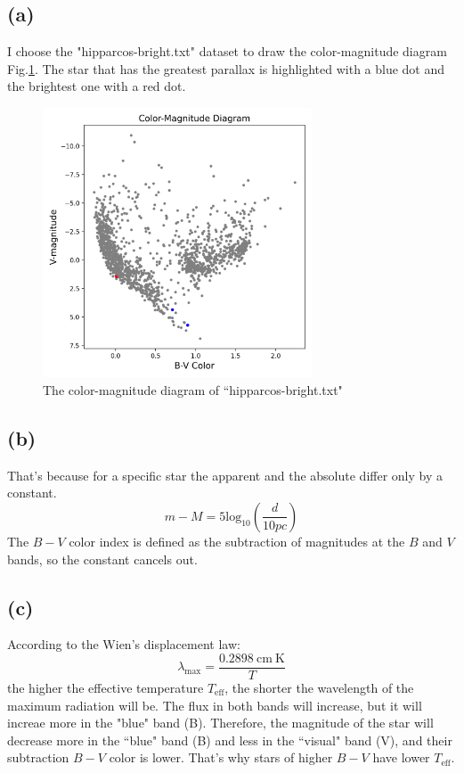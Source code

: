 \documentclass[a4paper,12pt]{article}
\begin{document}
\subsection*{(a)}
I choose the "hipparcos-bright.txt" dataset to draw the 
color-magnitude diagram Fig.\ref{fig1}. The star that has the greatest parallax is 
highlighted with a blue dot and the brightest one with a red dot.
\begin{figure}[htbp]
    \centering
    \includegraphics[width=8cm]{color_mag.png}
    \caption{The color-magnitude diagram of ``hipparcos-bright.txt"}
    \label{fig1}
\end{figure}

\subsection*{(b)}
That's because for a specific star the apparent and the absolute 
differ only by a constant.
\begin{equation}
    m-M = 5 \text{log}_{10}(\frac{d}{10pc})
\end{equation}
The $B-V$ color index is defined as 
the subtraction of magnitudes at the $B$ and $V$ bands, so the constant 
cancels out.

\subsection*{(c)}
According to the Wien's displacement law:
\begin{equation}
    \lambda_{\text{max}} = \frac{0.2898 \ \text{cm} \ \text{K}}{T}
\end{equation}
the higher the effective temperature $T_{\text{eff}}$, 
the shorter the wavelength of the maximum radiation will be.
The flux in both bands will increase, but it will increae more 
in the "blue" band (B). 
Therefore, the magnitude of the star will decrease more in the ``blue" band (B) 
and less in the ``visual" band (V), and their subtraction $B-V$ 
color is lower. 
That's why stars of higher $B-V$ have lower $T_{\text{eff}}$.
\end{document}
